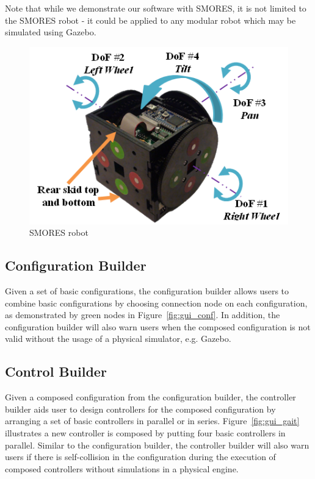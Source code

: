 \documentclass[conference]{IEEEtran}
\theoremstyle{definition}
\begin{document}
Note that while we demonstrate our software with SMORES, it is not limited to
the SMORES robot - it could be applied to any modular robot which may be
simulated using Gazebo.


\begin{figure}[tb]
    \begin{center}
        \includegraphics[width=\columnwidth]{images/smores_robot.png}
    \end{center}
    \caption{SMORES robot}
    \label{fig:SmoresRobot}
\end{figure}

\subsection{Configuration Builder}
Given a set of basic configurations, the configuration builder allows users to combine basic configurations by choosing connection node on each configuration, as demonstrated by green nodes in Figure~\ref{fig:gui_conf}. In addition, the configuration builder will also warn users when the composed configuration is not valid without the usage of a physical simulator, e.g. Gazebo.

\subsection{Control Builder}
Given a composed configuration from the configuration builder, the controller builder aids user to design controllers for the composed configuration by arranging a set of basic controllers in parallel or in series. Figure~\ref{fig:gui_gait} illustrates a new controller is composed by putting four basic controllers in parallel. Similar to the configuration builder, the controller builder will also warn users if there is self-collision in the configuration during the execution of composed controllers without simulations in a physical engine.
\end{document}
